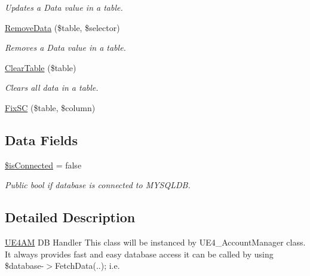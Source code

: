 \begin{DoxyCompactItemize}
\begin{DoxyCompactList}\small\item\em Updates a Data value in a table. \end{DoxyCompactList}\item 
\hyperlink{class_u_e4___d_b_handler_a506e0999a4c4050889d2899f4c50ce46}{Remove\-Data} (\$table, \$selector)
\begin{DoxyCompactList}\small\item\em Removes a Data value in a table. \end{DoxyCompactList}\item 
\hyperlink{class_u_e4___d_b_handler_aa34854f1f621fbbe81c8af133952c360}{Clear\-Table} (\$table)
\begin{DoxyCompactList}\small\item\em Clears all data in a table. \end{DoxyCompactList}\item 
\hyperlink{class_u_e4___d_b_handler_a15e31611d6efcedddeeafd7d25a7e583}{Fix\-S\-C} (\$table, \$column)
\end{DoxyCompactItemize}
\subsection*{Data Fields}
\begin{DoxyCompactItemize}
\item 
\hypertarget{class_u_e4___d_b_handler_a50ceed0b08e9ad3dcaecc2ac188b2047}{\hyperlink{class_u_e4___d_b_handler_a50ceed0b08e9ad3dcaecc2ac188b2047}{\$is\-Connected} = false}\label{class_u_e4___d_b_handler_a50ceed0b08e9ad3dcaecc2ac188b2047}

\begin{DoxyCompactList}\small\item\em Public bool if database is connected to M\-Y\-S\-Q\-L\-D\-B. \end{DoxyCompactList}\end{DoxyCompactItemize}


\subsection{Detailed Description}
\hyperlink{class_u_e4_a_m}{U\-E4\-A\-M} D\-B Handler This class will be instanced by U\-E4\-\_\-\-Account\-Manager class. It always provides fast and easy database access it can be called by using \$database-\/$>$Fetch\-Data(..); i.\-e. 

